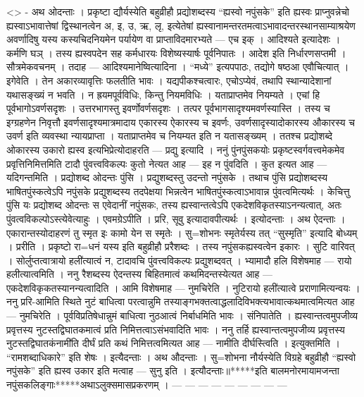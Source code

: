 \textless{}\textgreater{} - अथ ओदन्ताः । प्रकृष्टा द्यौर्यस्येति
बहुव्रीहौ प्रद्योशब्दस्य ``ह्यस्वो नपुंसके'' इति ह्यस्वः प्राप्नुवन्नेचो
ह्यस्वाऽभावात्तेषां द्विस्थानत्वेन अ, इ, उ, ऋ, लृ, इत्येतेषां
ह्यस्वानामन्तरतमत्वाऽभावादन्तरस्थानसाम्याश्रयेण अवर्णादिषु यस्य
कस्यचिदनियमेन पर्यायेण वा प्राप्ताविदमारभ्यते --- एच इक् । आदिश्यते
इत्यादेशः । कर्मणि घञ् । तस्य ह्यस्वपदेन सह कर्मधारयः विशेष्यस्यार्षः
पूर्वनिपातः । आदेश इति निर्धारणसप्तमी । सौत्रमेकवचनम् । तदाह ---
आदिश्यमानेष्वित्यादिना । ``मध्ये'' इत्यपपाठः, तद्योगे षष्ठआ एवौचित्यात्
। इगेवेति । तेन अकारव्यावृत्तिः फलतीति भावः । यद्यपीकश्चत्वारः,
एचोऽप्येवं, तथापि स्थान्यादेशानां यथासङ्ख्यं न भवति । न ह्रयमपूर्वविधिः,
किन्तु नियमविधिः । यताप्राप्तमेव नियम्यते । एचां हि पूर्वभागोऽवर्णसदृशः
। उत्तरभागस्तु इवर्णोवर्णसदृशः । तत्पर पूर्वभागसादृश्यमवर्णस्यास्ति ।
तस्य च इग्ग्रहणेन निवृत्तौ इवर्णसादृश्यमात्रमादाय एकारस्य ऐकारस्य च
इवर्णः, उवर्णसादृस्यादोकारस्य औकारस्य च उवर्ण इति व्यवस्था न्यायप्राप्ता
। यताप्राप्तमेव च नियम्यत इति न यतासङ्ख्यम् । ततश्च प्रद्योशब्दे ओकारस्य
उकारो ह्यस्व इत्यभिप्रेत्योदाहरति --- प्रद्यु इत्यादि । ननुं
पुंनपुंसकयोः प्रकृष्टस्वर्गवत्त्वमेकमेव प्रवृत्तिनिमित्तमिति टादौ
पुंवत्त्वविकल्पः कुतो नेत्यत आह --- इह न पुंवदिति । कुत इत्यत आह ---
यदिगन्तमिति । प्रद्योशब्द ओदन्तः पुंसि । प्रद्युशब्दस्तु उदन्तो नपुंसके
। तथाच पुंसि प्रद्योशब्दस्य भाषितपुंस्कत्वेऽपि नपुंसके प्रद्युशब्दस्य
तदपेक्षया भिन्नत्वेन भाषितपुंस्कत्वाऽभावान्न पुंवत्वमित्यर्थः । केचित्तु
पुंसि यः प्रद्योशब्द ओदन्तः स एवेदानीं नपुंसकः, तस्य ह्यस्वान्तत्वेऽपि
एकदेशविकृतस्याऽनन्यत्वात्, अतः पुंवत्वविकल्पोऽस्त्येवेत्याहुः ।
एवमग्रेऽपीति । प्ररि, सूवु इत्यादावपीत्यर्थः । इत्योदन्ताः । अथ ऐदन्ताः
। एकारान्तस्योदाहरणं तु स्मृत इः कामो येन स स्मृतेः । सु=शोभनः
स्मृतेर्यस्य तत् ``सुस्मृति'' इत्यादि बोध्यम् । प्ररीति । प्रकृष्टो
रा=धनं यस्य इति बहुव्रीहौ प्ररैशब्दः । तस्य नपुंसकह्यस्वत्वेन इकारः ।
सुटि वारिवत् । सोर्लुप्तत्वात्रायो हली॑त्यात्वं न, टादावचि
पुंवत्त्वविकल्पः प्रद्युशब्दवत् । भ्यामादौ हलि विशेषमाह --- रायो
हलीत्यात्वमिति । ननु रैशब्दस्य ऐदन्तस्य बिहितमात्वं कथमिदन्तस्येत्यत आह
--- एकदेशविकृकतस्यानन्यत्वादिति । आमि विशेषमाह --- नुमचिरेति । नुटिरायो
हली॑त्यात्वे प्रराणामित्यन्वयः । ननु प्ररि-आमिति स्थिते नुटं बाधित्वा
परत्वान्नुमि तस्याङ्गभक्तत्वाद्धलादिविभक्त्यभावात्कथमात्वमित्यत आह ---
नुमचिरेति । पूर्वविप्रतिषेधान्नुमं बाधित्वा नुठआत्वं निर्बाधमिति भावः ।
संनिपातेति । ह्यस्वान्तत्वमुपजीव्य प्रवृत्तस्य नुटस्तद्विघातकमात्वं
प्रति निमित्तत्वाऽसंभवादिति भावः । ननु तर्हि ह्यस्वान्तत्वमुपजीव्य
प्रवृत्तस्य नुटस्तद्विघातकंनामी॑ति दीर्घं प्रति कथं निमित्तत्वमित्यत आह
--- नामीति दीर्घस्त्विति । इत्युक्तमिति । ``रामशब्दाधिकारे'' इति शेषः ।
इत्यैदन्ताः । अथ औदन्ताः । सु=शोभना नौर्यस्येति विग्रहे बहुव्रीहौ
``ह्यस्वो नपुंसके'' इति ह्यस्व उकार इति मत्वाह --- सुनु इति ।
इत्यौदन्ताः॥*****इति बालमनोरमायामजन्ता
नपुंसकलिङ्गाः*****अथाऽलुक्समासप्रकरणम् । --- --- --- --- --- --- --- ---
---
